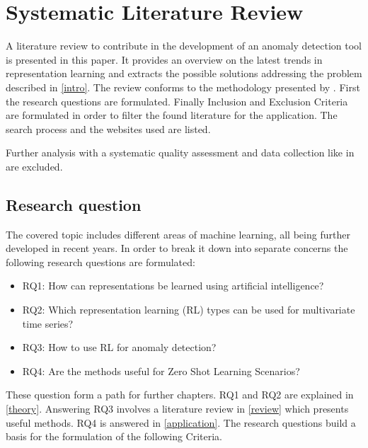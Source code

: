 \section{Systematic Literature Review}\label{methods}
A literature review to contribute in the development of an anomaly detection tool is presented in this paper. It provides an overview on the latest trends in representation learning and extracts the possible solutions addressing the problem described in \autoref{intro}. The review conforms to the methodology presented by \cite{kitchenham_systematic_2009}. First the research questions are formulated. Finally Inclusion and Exclusion Criteria are formulated in order to filter the found literature for the application. The search process and the websites used are listed.

Further analysis with a systematic quality assessment and data collection like in \cite{kitchenham_systematic_2009} are excluded.
\subsection{Research question}
The covered topic includes different areas of machine learning, all being further developed in recent years.
In order to break it down into separate concerns the following research questions are formulated:
\begin{itemize}
  \item RQ1: How can representations be learned using artificial intelligence?
  \item RQ2: Which representation learning (RL) types can be used for multivariate time series?
  \item RQ3: How to use RL for anomaly detection?
  \item RQ4: Are the methods useful for Zero Shot Learning Scenarios?
\end{itemize}
These question form a path for further chapters. RQ1 and RQ2 are explained in \autoref{theory}. Answering RQ3 involves a literature review in \autoref{review} which presents useful methods. RQ4 is answered in \autoref{application}. The research questions build a basis for the formulation of the following Criteria.
